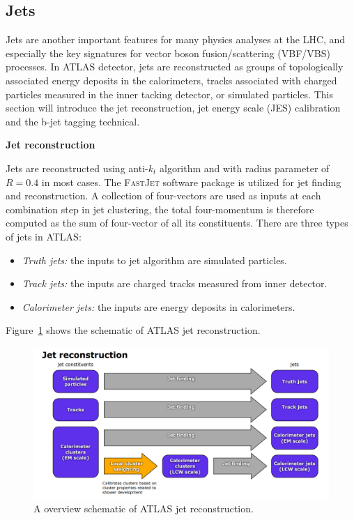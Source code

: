 \subsection{Jets}
\label{sec:jet}

Jets are another important features for many physics analyses at the LHC, and especially the key signatures for vector boson fusion/scattering (VBF/VBS) processes.
In ATLAS detector, jets are reconstructed as groups of topologically associated energy deposits in the calorimeters, 
tracks associated with charged particles measured in the inner tacking detector, or simulated particles.
This section will introduce the jet reconstruction, jet energy scale (JES) calibration and the b-jet tagging technical.

\textbf{Jet reconstruction}

Jets are reconstructed using anti-$k_{t}$ algorithm\cite{Cacciari_2008} and with radius parameter of $R = 0.4$ in most cases.
The \textsc{FastJet} software package\cite{Cacciari2012} is utilized for jet finding and reconstruction.
A collection of four-vectors are used as inputs at each combination step in jet clustering, 
the total four-momentum is therefore computed as the sum of four-vector of all its constituents.
There are three types of jets in ATLAS:
\begin{itemize}
	\item \textit{Truth jets:} the inputs to jet algorithm are simulated particles.
	\item \textit{Track jets:} the inputs are charged tracks measured from inner detector.
	\item \textit{Calorimeter jets:} the inputs are energy deposits in calorimeters.
\end{itemize}
Figure~\ref{fig:jet_reco_overview} shows the schematic of ATLAS jet reconstruction.
\begin{figure}[!htb]
  \centering
  \includegraphics[width=1.0\textwidth]{figures/Simulation/threetypes_jet_reco.png}
  \caption{A overview schematic of ATLAS jet reconstruction\cite{Aad:2014bia}.}
  \label{fig:jet_reco_overview}
\end{figure}


